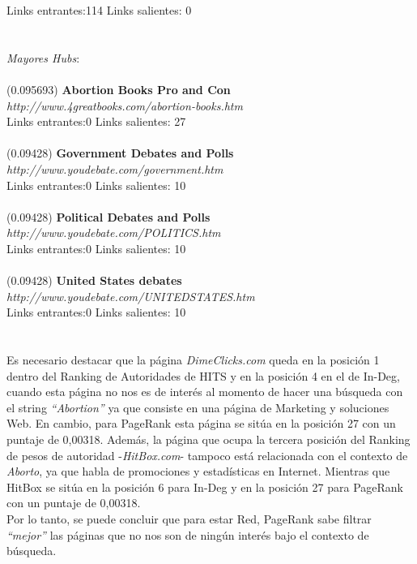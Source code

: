 \documentclass[a4paper]{article}
\begin{document}
Links entrantes:114 \indent Links salientes: 0\\
\\
\\
\emph{Mayores Hubs}: \\
\\
(0.095693)\textbf{ Abortion Books Pro and Con} \\
\textit{http://www.4greatbooks.com/abortion-books.htm} \\
Links entrantes:0 \indent Links salientes: 27\\
\\
(0.09428) \textbf{Government Debates and Polls} \\
\textit{http://www.youdebate.com/government.htm }\\
Links entrantes:0 \indent Links salientes: 10\\
\\
(0.09428) \textbf{Political Debates and Polls }\\
\textit{http://www.youdebate.com/POLITICS.htm} \\
Links entrantes:0 \indent Links salientes: 10\\
\\
(0.09428) \textbf{United States debates} \\
\textit{http://www.youdebate.com/UNITEDSTATES.htm} \\
Links entrantes:0 \indent Links salientes: 10\\
\\
\\
\indent Es necesario destacar que  la p\'agina \emph{DimeClicks.com} queda en la posici\'on 1 dentro del Ranking de Autoridades de HITS y en la posici\'on 4 en el de In-Deg, cuando esta p\'agina no nos es de inter\'es al momento de hacer una b\'usqueda con el string \textit{``Abortion''} ya que consiste en una p\'agina de Marketing y soluciones Web. En cambio, para PageRank esta p\'agina se sit\'ua en la posici\'on 27 con un puntaje de 0,00318. Adem\'as, la p\'agina que ocupa la tercera posici\'on del Ranking de pesos de autoridad -\emph{HitBox.com}- tampoco est\'a relacionada con el contexto de \emph{Aborto}, ya que habla de promociones y estad\'isticas en Internet. Mientras que HitBox se sit\'ua en la posici\'on 6 para In-Deg y en la posici\'on 27 para PageRank con un puntaje de 0,00318. \\
\indent Por lo tanto, se puede concluir que para estar Red, PageRank sabe filtrar \textit{``mejor''} las p\'aginas que no nos son de ning\'un inter\'es bajo el contexto de b\'usqueda.\\
\end{document}
